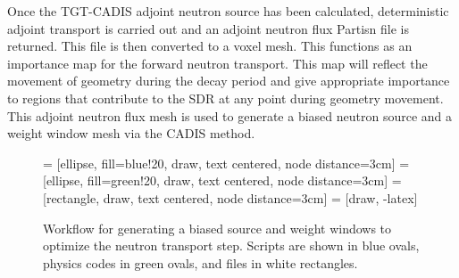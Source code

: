 Once the TGT-CADIS adjoint neutron source has been calculated, deterministic
adjoint transport is carried out and an adjoint neutron flux Partisn file is
returned.  This file is then converted to a voxel mesh.
This functions as an importance map for the forward neutron transport.
This map will reflect the movement of geometry during the decay period and give
appropriate importance to regions that contribute to the SDR at any point
during geometry movement.
This adjoint neutron flux mesh is used to generate a biased neutron source and a 
weight window mesh via the CADIS method.

\begin{figure}\label{gen_biased}
\centering

         = [ellipse, fill=blue!20, draw, text centered, node distance=3cm]
         = [ellipse, fill=green!20, draw, text centered, node distance=3cm]
         = [rectangle, draw, text centered, node distance=3cm]
         = [draw, -latex]
        

	\caption[Workflow to generate TGT-CADIS biased source and weight
	windows]
	{Workflow for generating a biased source and weight windows to
	optimize the neutron transport step.  Scripts are shown in
	blue ovals, physics codes in green ovals, and files in white
	rectangles.}
\end{figure}

